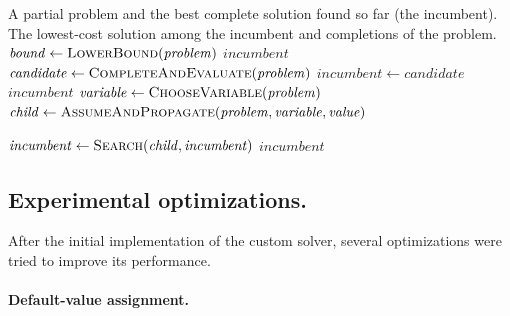 \begin{algorithm}[htbp]
    \caption{Custom solver search (simplified).}
    \label{alg:custom-search}
    \begin{algorithmic}[1]
        \Require A partial problem and the best complete solution found so far (the incumbent).
        \Ensure The lowest-cost solution among the incumbent and completions of the problem.
            \State $\mathit{bound} \gets \Call{LowerBound}{\mathit{problem}}$
                \State \Return $\mathit{incumbent}$ 
            \EndIf
                \State $\mathit{candidate} \gets \Call{CompleteAndEvaluate}{\mathit{problem}}$
                    \State $\mathit{incumbent} \gets \mathit{candidate}$ 
                \EndIf
                \State \Return $\mathit{incumbent}$
            \EndIf
            \State $\mathit{variable} \gets \Call{ChooseVariable}{\mathit{problem}}$
                \State $\mathit{child} \gets \Call{AssumeAndPropagate}{\mathit{problem}, \mathit{variable}, \mathit{value}}$

                    \State $\mathit{incumbent} \gets \Call{Search}{\mathit{child}, \mathit{incumbent}}$
                \EndIf
            \EndFor
            \State \Return $\mathit{incumbent}$
        \EndFunction
    \end{algorithmic}
\end{algorithm}

\subsection{Experimental optimizations.}

After the initial implementation of the custom solver, several optimizations were tried to improve its performance.

\paragraph{Default-value assignment.}

